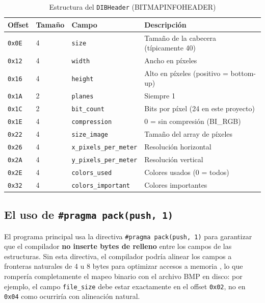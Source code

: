\documentclass[12pt, letterpaper]{article}
\begin{document}
\begin{table}[H]
    \centering
    \begin{tabular}{@{}lllp{5.5cm}@{}}
        \toprule
        \textbf{Offset} & \textbf{Tamaño} & \textbf{Campo} & \textbf{Descripción} \\
        \midrule
        \texttt{0x0E} & 4 & \texttt{size}                & Tamaño de la cabecera (típicamente 40) \\
        \texttt{0x12} & 4 & \texttt{width}               & Ancho en píxeles \\
        \texttt{0x16} & 4 & \texttt{height}              & Alto en píxeles (positivo = bottom-up) \\
        \texttt{0x1A} & 2 & \texttt{planes}              & Siempre 1 \\
        \texttt{0x1C} & 2 & \texttt{bit\_count}          & Bits por píxel (24 en este proyecto) \\
        \texttt{0x1E} & 4 & \texttt{compression}         & 0 = sin compresión (BI\_RGB) \\
        \texttt{0x22} & 4 & \texttt{size\_image}         & Tamaño del array de píxeles \\
        \texttt{0x26} & 4 & \texttt{x\_pixels\_per\_meter} & Resolución horizontal \\
        \texttt{0x2A} & 4 & \texttt{y\_pixels\_per\_meter} & Resolución vertical \\
        \texttt{0x2E} & 4 & \texttt{colors\_used}        & Colores usados (0 = todos) \\
        \texttt{0x32} & 4 & \texttt{colors\_important}   & Colores importantes \\
        \bottomrule
    \end{tabular}
    \caption{Estructura del \texttt{DIBHeader} (BITMAPINFOHEADER) \cite{microsoft_bitmapinfoheader}}
\end{table}

\subsection*{El uso de \texttt{\#pragma pack(push, 1)}}

El programa principal usa la directiva \texttt{\#pragma pack(push, 1)} para garantizar que el compilador \textbf{no inserte bytes de relleno} entre los campos de las estructuras. Sin esta directiva, el compilador podría alinear los campos a fronteras naturales de 4 u 8 bytes para optimizar accesos a memoria \cite{wikipedia_data_alignment}, lo que rompería completamente el mapeo binario con el archivo BMP en disco: por ejemplo, el campo \texttt{file\_size} debe estar exactamente en el offset \texttt{0x02}, no en \texttt{0x04} como ocurriría con alineación natural.
\end{document}
